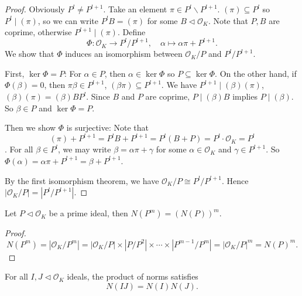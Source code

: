 \begin{proof}
    Obviously $P^{l}\neq P^{l+1}$. Take an element $\pi\in P^{l} \backslash P^{l+1}$. $(\pi)\subseteq P^{l}$ so $P^{l}\mid (\pi)$, so we can write $P^{l}B=(\pi)$ for some $B\lhd \mathcal{O}_{K}$. Note that $P,B$ are coprime, otherwise $P^{l+1}\mid (\pi)$. Define 
    \[
    \Phi: \mathcal{O}_{K}\to P^{l}/P^{l+1},\quad \alpha\mapsto \alpha \pi+P^{l+1}.
    \]
    We show that $\Phi$ induces an isomorphism between $\mathcal{O}_{K} /P$ and $P^{l}/P^{l+1}$. 

    First, $\ker \Phi=P$: For $\alpha\in P$, then $\alpha\in \ker\Phi$ so $P\subseteq \ker \Phi$. On the other hand, if $\Phi(\beta)=0$, then $\pi \beta\in P^{l+1}$, $(\beta\pi)\subseteq P^{l+1}$. We have $P^{l+1}\mid (\beta)(\pi)$, $(\beta)(\pi)=(\beta)BP^{l}$. Since $B$ and $P$ are coprime, $P\mid (\beta)B$ implies $P\mid (\beta)$. So $\beta\in P$ and $\ker \Phi=P$. 

    Then we show $\Phi$ is surjective: Note that 
    \[
    (\pi)+P^{l+1}=P^{l}B+P^{l+1}=P^{l}(B+P)=P^{l}\cdot \mathcal{O}_{K}=P^{l}
    \]. 
    For all $\beta\in P^{l}$, we may write $\beta=\alpha \pi+\gamma$ for some $\alpha\in \mathcal{O}_{K}$ and $\gamma\in P^{l+1}$. So $\Phi(\alpha)=\alpha\pi+P^{l+1}=\beta+P^{l+1}$. 

    By the first isomorphism theorem, we have $\mathcal{O}_{K}/P\cong P^{l}/P^{l+1}$. Hence $\left| \mathcal{O}_{K} /P \right|=\left| P^{l}/P^{l+1} \right|$. 
\end{proof}

\begin{theorem}
    Let $P\lhd \mathcal{O}_{K}$ be a prime ideal, then $N(P^{m})=(N(P))^{m}$. 
\end{theorem}

\begin{proof}
    \[N(P^{m})=\left| \mathcal{O}_{K}/P^{m} \right| =\left| \mathcal{O}_{K}/P \right| \times \left| P/P^{2} \right| \times\cdots\times \left| P^{m-1}/P^{m} \right|=\left| \mathcal{O}_{K}/P \right|^{m}=N(P)^{m}. \]
\end{proof}

\begin{corollary}\label{cor-multiplicativityNorm}
    For all $I,J\lhd \mathcal{O}_{K}$ ideals, the product of norms satisfies 
    \[
    N(IJ)=N(I)N(J).
    \]
\end{corollary}

